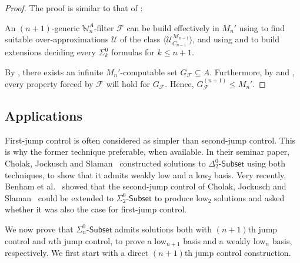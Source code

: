 \documentclass{article}
\def\WW{\mathbb{W}}
\def\F{\mathcal{F}}
\def\U{\mathcal{U}}
\def\M{\mathcal{M}}
\newcommand{\Sub}[1]{{#1}\mbox{-}\mathsf{Subset}}
\numberwithin{theorem}{section}
\newtheorem{proposition}[theorem]{Proposition}
\theoremstyle{definition}
\begin{document}

\begin{proof}
The proof is similar to that of :

An $(n+1)$-generic $\WW^A_n$-filter $\F$ can be build effectively in $M_n'$ using  to find suitable over-approximations $\U$ of the class $\langle \U_{C_{n-1}}^{\M_{n-1}} \rangle$, and using  and  to build extensions deciding every $\Sigma_k^0$ formulas for $k \leq n+1$.

By , there exists an infinite $M_n'$-computable set $G_{\F} \subseteq A$. Furthermore, by  and , every property forced by $\F$ will hold for $G_{\F}$. Hence, $G_{\F}^{(n+1)} \leq M_{n}'$.
\end{proof}




\subsection{Applications}

First-jump control is often considered as simpler than second-jump control. This is why the former technique preferable, when available. In their seminar paper, Cholak, Jockusch and Slaman~\cite{cholak2001strength} constructed solutions to $\Sub{\Delta^0_2}$ using both techniques, to show that it admits weakly low and a low${}_2$ basis.
Very recently, Benham et al.~\cite{benham2024ginsburg} showed that the second-jump control of Cholak, Jockusch and Slaman~\cite{cholak2001strength} could be extended to $\Sub{\Sigma^0_2}$ to produce low${}_2$ solutions and asked whether it was also the case for first-jump control.

We now prove that $\Sub{\Sigma^0_n}$ admits solutions both with $(n+1)$th jump control and $n$th jump control,
to prove a low${}_{n+1}$ basis and a weakly low${}_n$ basis, respectively. We first start with a direct $(n+1)$th jump control construction.
\end{document}
